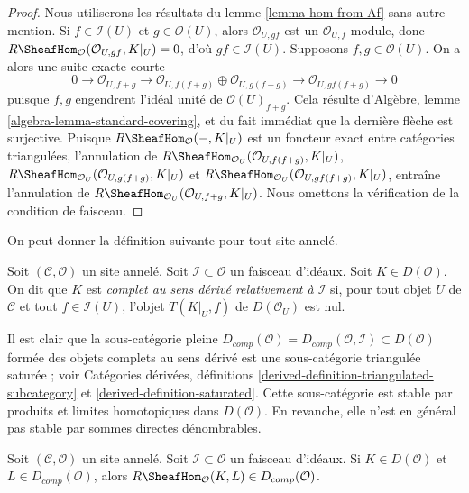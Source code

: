 \begin{proof}
Nous utiliserons les résultats du lemme \ref{lemma-hom-from-Af} sans autre
mention. Si $f \in \mathcal{I}(U)$ et $g \in \mathcal{O}(U)$, alors
$\mathcal{O}_{U, gf}$ est un $\mathcal{O}_{U, f}$-module,
donc $R\SheafHom_\mathcal{O}(\mathcal{O}_{U, gf}, K|_U) = 0$, d'où
$gf \in \mathcal{I}(U)$. Supposons $f, g \in \mathcal{O}(U)$.
On a alors une suite exacte courte
$$
0 \to \mathcal{O}_{U, f + g} \to
\mathcal{O}_{U, f(f + g)} \oplus \mathcal{O}_{U, g(f + g)} \to
\mathcal{O}_{U, gf(f + g)} \to 0
$$
puisque $f, g$ engendrent l'idéal unité de $\mathcal{O}(U)_{f + g}$.
Cela résulte
d'Algèbre, lemme \ref{algebra-lemma-standard-covering},
et du fait immédiat que la dernière flèche est surjective.
Puisque $R\SheafHom_\mathcal{O}( - , K|_U)$ est un foncteur exact
entre catégories triangulées, l'annulation de
$R\SheafHom_{\mathcal{O}_U}(\mathcal{O}_{U, f(f + g)}, K|_U)$,
$R\SheafHom_{\mathcal{O}_U}(\mathcal{O}_{U, g(f + g)}, K|_U)$ et
$R\SheafHom_{\mathcal{O}_U}(\mathcal{O}_{U, gf(f + g)}, K|_U)$,
entraîne l'annulation de
$R\SheafHom_{\mathcal{O}_U}(\mathcal{O}_{U, f + g}, K|_U)$.
Nous omettons la vérification de la condition de faisceau.
\end{proof}

\noindent
On peut donner la définition suivante pour tout site annelé.

\begin{definition}
\label{definition-derived-complete}
Soit $(\mathcal{C}, \mathcal{O})$ un site annelé.
Soit $\mathcal{I} \subset \mathcal{O}$ un faisceau d'idéaux.
Soit $K \in D(\mathcal{O})$. On dit que $K$ est
{\it complet au sens dérivé relativement à $\mathcal{I}$}
si, pour tout objet $U$ de $\mathcal{C}$ et tout $f \in \mathcal{I}(U)$,
l'objet $T(K|_U, f)$ de $D(\mathcal{O}_U)$ est nul.
\end{definition}

\noindent
Il est clair que la sous-catégorie pleine
$D_{comp}(\mathcal{O}) = D_{comp}(\mathcal{O}, \mathcal{I}) \subset
D(\mathcal{O})$ formée des objets complets au sens dérivé
est une sous-catégorie triangulée saturée ; voir
Catégories dérivées, définitions
\ref{derived-definition-triangulated-subcategory} et
\ref{derived-definition-saturated}. Cette sous-catégorie est stable
par produits et limites homotopiques dans $D(\mathcal{O})$.
En revanche, elle n'est en général pas stable par sommes directes dénombrables.

\begin{lemma}
\label{lemma-derived-complete-internal-hom}
Soit $(\mathcal{C}, \mathcal{O})$ un site annelé.
Soit $\mathcal{I} \subset \mathcal{O}$ un faisceau d'idéaux.
Si $K \in D(\mathcal{O})$ et $L \in D_{comp}(\mathcal{O})$, alors
$R\SheafHom_\mathcal{O}(K, L) \in D_{comp}(\mathcal{O})$.
\end{lemma}

